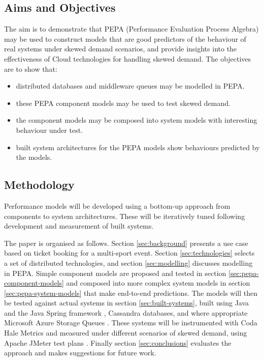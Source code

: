 \documentclass[runningheads]{llncs}
\begin{document}
\subsection{Aims and Objectives}

The aim is to demonstrate that PEPA (Performance Evaluation Process Algebra) \cite{RN1051} may be used to construct models that are good predictors of the behaviour of real systems under skewed demand scenarios, and provide insights into the effectiveness of Cloud technologies for handling skewed demand.  The objectives are to show that:
\begin{itemize}
	\item distributed databases and middleware queues may be modelled in PEPA.
	\item these PEPA component models may be used to test skewed demand.
	\item the component models may be composed into system models with interesting behaviour under test.
	\item built system architectures for the PEPA models show behaviours predicted by the models.
\end{itemize}

\subsection{Methodology}

Performance models will be developed using a bottom-up approach from components to system architectures.  These will be iteratively tuned following development and measurement of built systems.

The paper is organised as follows.  Section \ref{sec:background} presents a use case based on ticket booking for a multi-sport event.  Section \ref{sec:technologies} selects a set of distributed technologies, and section \ref{sec:modelling} discusses modelling in PEPA.  Simple component models are proposed and tested in section \ref{sec:pepa-component-models} and composed into more complex system models in section \ref{sec:pepa-system-models} that make end-to-end predictions.  The models will then be tested against actual systems in section \ref{sec:built-systems}, built using Java and the Java Spring framework \cite{RN1076}, Cassandra \cite{RN1075,RN1050} databases, and where appropriate Microsoft Azure Storage Queues \cite{RN1072}.  These systems will be instrumented with Coda Hale Metrics \cite{RN1079} and measured under different scenarios of skewed demand, using Apache JMeter test plans \cite{RN1074}.  Finally section \ref{sec:conclusions} evaluates the approach and makes suggestions for future work.
\end{document}
